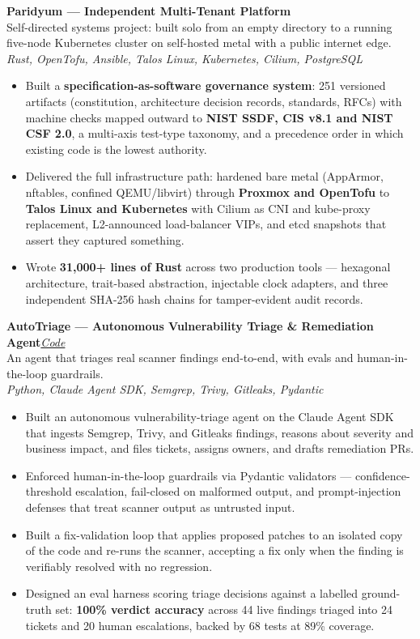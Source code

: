\documentclass[10pt,a4paper]{article}
\newcommand{\entry}[3]{%
  \textbf{#1}\hfill\textit{\small #2}\\[-0.15em]
  {\small #3}\par\vspace{0.08em}%
}
\begin{document}
\entry{Paridyum --- Independent Multi-Tenant Platform}{}{Self-directed systems project: built solo from an empty directory to a running five-node Kubernetes cluster on self-hosted metal with a public internet edge.\\ \textit{Rust, OpenTofu, Ansible, Talos Linux, Kubernetes, Cilium, PostgreSQL}}
\begin{itemize}
  \item Built a \textbf{specification-as-software governance system}: 251 versioned artifacts (constitution, architecture decision records, standards, RFCs) with machine checks mapped outward to \textbf{NIST SSDF, CIS v8.1 and NIST CSF 2.0}, a multi-axis test-type taxonomy, and a precedence order in which existing code is the lowest authority.
  \item Delivered the full infrastructure path: hardened bare metal (AppArmor, nftables, confined QEMU/libvirt) through \textbf{Proxmox and OpenTofu} to \textbf{Talos Linux and Kubernetes} with Cilium as CNI and kube-proxy replacement, L2-announced load-balancer VIPs, and etcd snapshots that assert they captured something.
  \item Wrote \textbf{31,000+ lines of Rust} across two production tools --- hexagonal architecture, trait-based abstraction, injectable clock adapters, and three independent SHA-256 hash chains for tamper-evident audit records.
\end{itemize}

\entry{AutoTriage --- Autonomous Vulnerability Triage \& Remediation Agent}{\href{https://github.com/rohanbatrain/autotriage}{Code}}{An agent that triages real scanner findings end-to-end, with evals and human-in-the-loop guardrails.\\ \textit{Python, Claude Agent SDK, Semgrep, Trivy, Gitleaks, Pydantic}}
\begin{itemize}
  \item Built an autonomous vulnerability-triage agent on the Claude Agent SDK that ingests Semgrep, Trivy, and Gitleaks findings, reasons about severity and business impact, and files tickets, assigns owners, and drafts remediation PRs.
  \item Enforced human-in-the-loop guardrails via Pydantic validators --- confidence-threshold escalation, fail-closed on malformed output, and prompt-injection defenses that treat scanner output as untrusted input.
  \item Built a fix-validation loop that applies proposed patches to an isolated copy of the code and re-runs the scanner, accepting a fix only when the finding is verifiably resolved with no regression.
  \item Designed an eval harness scoring triage decisions against a labelled ground-truth set: \textbf{100\% verdict accuracy} across 44 live findings triaged into 24 tickets and 20 human escalations, backed by 68 tests at 89\% coverage.
\end{itemize}
\end{document}

